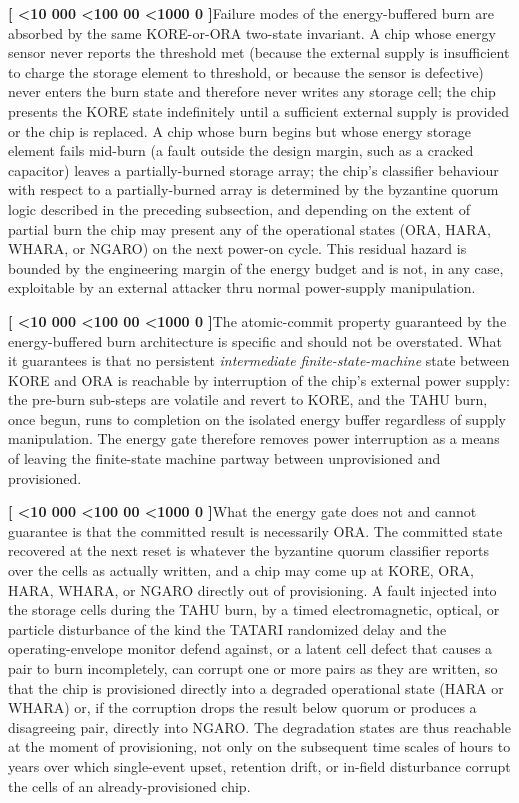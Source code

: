 \documentclass[12pt,letterpaper]{article}
\newcounter{para}
\newcommand{\padzero}{%
  \ifnum\value{para}<10 000\else%
  \ifnum\value{para}<100 00\else%
  \ifnum\value{para}<1000 0\else%
  \fi\fi\fi}
\newcommand{\para}{%
  \refstepcounter{para}\noindent\textbf{[\padzero\arabic{para}]}\hspace{0.5em}\ignorespaces}
\begin{document}
\para Failure modes of the energy-buffered burn are absorbed by the same KORE-or-ORA two-state invariant. A chip whose energy sensor never reports the threshold met (because the external supply is insufficient to charge the storage element to threshold, or because the sensor is defective) never enters the burn state and therefore never writes any storage cell; the chip presents the KORE state indefinitely until a sufficient external supply is provided or the chip is replaced. A chip whose burn begins but whose energy storage element fails mid-burn (a fault outside the design margin, such as a cracked capacitor) leaves a partially-burned storage array; the chip's classifier behaviour with respect to a partially-burned array is determined by the byzantine quorum logic described in the preceding subsection, and depending on the extent of partial burn the chip may present any of the operational states (ORA, HARA, WHARA, or NGARO) on the next power-on cycle. This residual hazard is bounded by the engineering margin of the energy budget and is not, in any case, exploitable by an external attacker thru normal power-supply manipulation.

\para The atomic-commit property guaranteed by the energy-buffered burn architecture is specific and should not be overstated. What it guarantees is that no persistent \emph{intermediate finite-state-machine} state between KORE and ORA is reachable by interruption of the chip's external power supply: the pre-burn sub-steps are volatile and revert to KORE, and the TAHU burn, once begun, runs to completion on the isolated energy buffer regardless of supply manipulation. The energy gate therefore removes power interruption as a means of leaving the finite-state machine partway between unprovisioned and provisioned.

\para What the energy gate does not and cannot guarantee is that the committed result is necessarily ORA. The committed state recovered at the next reset is whatever the byzantine quorum classifier reports over the cells as actually written, and a chip may come up at KORE, ORA, HARA, WHARA, or NGARO directly out of provisioning. A fault injected into the storage cells during the TAHU burn, by a timed electromagnetic, optical, or particle disturbance of the kind the TATARI randomized delay and the operating-envelope monitor defend against, or a latent cell defect that causes a pair to burn incompletely, can corrupt one or more pairs as they are written, so that the chip is provisioned directly into a degraded operational state (HARA or WHARA) or, if the corruption drops the result below quorum or produces a disagreeing pair, directly into NGARO. The degradation states are thus reachable at the moment of provisioning, not only on the subsequent time scales of hours to years over which single-event upset, retention drift, or in-field disturbance corrupt the cells of an already-provisioned chip.
\end{document}
